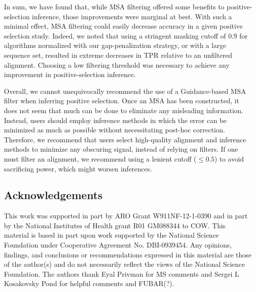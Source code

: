 \documentclass[11pt]{article}
\begin{document}
In sum, we have found that, while MSA filtering offered some benefits to positive-selection inference, those improvements were marginal at best. With such a minimal effect, MSA filtering could easily decrease accuracy in a given positive selection study. Indeed, we noted that using a stringent masking cutoff of 0.9 for algorithms normalized with our gap-penalization strategy, or with a large sequence set, resulted in extreme decreases in TPR relative to an unfiltered alignment. Choosing a low filtering threshold was necessary to achieve any improvement in positive-selection inference.  

Overall, we cannot unequivocally recommend the use of a Guidance-based MSA filter when inferring positive selection. Once an MSA has been constructed, it does not seem that much can be done to eliminate any misleading information. Instead, users should employ inference methods in which the error can be minimized as much as possible without necessitating post-hoc correction. Therefore, we recommend that users select high-quality alignment and inference methods to minimize any obscuring signal, instead of relying on filters. If one must filter an alignment, we recommend using a lenient cutoff ($\leq0.5$) to avoid sacrificing power, which might worsen inferences.



\subsection*{Acknowledgements}
This work was supported in part by ARO Grant W911NF-12-1-0390 and in part by the National Institutes of Health grant R01 GM088344 to COW. This material is based in part upon work supported by the National Science Foundation under Cooperative Agreement No. DBI-0939454. Any opinions, findings, and conclusions or recommendations expressed in this material are those of the author(s) and do not necessarily reflect the views of the National Science Foundation. The authors thank Eyal Privman for MS comments and Sergei L Kosakovsky Pond for helpful comments and FUBAR(?).



	

\bigskip
\end{document}
